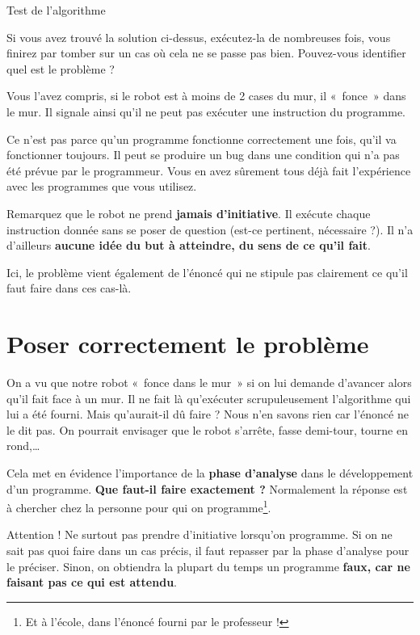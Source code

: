 	\begin{Emphase}[reflexion]{Test de l'algorithme}

		Si vous avez trouvé la solution ci-dessus, exécutez-la de nombreuses
		fois, vous finirez par tomber sur un cas où cela ne se passe pas bien.
		Pouvez-vous identifier quel est le problème ?

	\end{Emphase}

	Vous l'avez compris, si le robot est à moins de 2 cases
	du mur, il «~fonce~» dans le mur. Il signale ainsi
	qu'il ne peut pas exécuter une instruction du
	programme.
	
	Ce n'est pas parce qu'un programme
	fonctionne correctement une fois, qu'il va fonctionner
	toujours. Il peut se produire un bug dans une condition qui
	n'a pas été prévue par le programmeur. Vous en avez
	sûrement tous déjà fait l'expérience avec les
	programmes que vous utilisez.

	Remarquez que le robot ne prend \textbf{jamais
	d'initiative}. Il exécute chaque instruction donnée
	sans se poser de question (est-ce pertinent, nécessaire ?). Il
	n'a d'ailleurs \textbf{aucune idée du
	but à atteindre, du sens de ce qu'il fait}.
	
	Ici, le problème vient également de
	l'énoncé qui ne stipule pas clairement ce
	qu'il faut faire dans ces cas-là.

\section{Poser correctement le problème}

	On a vu que notre robot «~fonce dans le mur~» si on lui demande
	d'avancer alors qu'il fait face à un
	mur. Il ne fait là qu'exécuter scrupuleusement
	l'algorithme qui lui a été fourni. Mais
	qu'aurait-il dû faire ? Nous n'en
	savons rien car l'énoncé ne le dit pas. On pourrait
	envisager que le robot s'arrête, fasse demi-tour,
	tourne en rond,\dots
	
	Cela met en évidence l'importance de la \textbf{phase
	d'analyse} dans le développement d'un
	programme. \textbf{Que faut-il faire exactement ?} Normalement la
	réponse est à chercher chez la personne pour qui on programme\footnote{Et
	à l'école, dans l'énoncé fourni par
	le professeur ! }.
	
	Attention ! Ne surtout pas prendre d'initiative
	lorsqu'on programme. Si on ne sait pas quoi faire dans
	un cas précis, il faut repasser par la phase d'analyse
	pour le préciser. Sinon, on obtiendra la plupart du temps un programme
	\textbf{faux, car ne faisant pas ce qui est attendu}.

